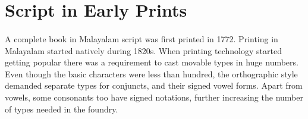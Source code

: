 \documentclass[10pt]{article}
\begin{document}
%
%
%
%
%




\section{Script in Early Prints }


\paragraph{}
A complete book in Malayalam script was first printed in 1772. Printing in Malayalam started natively during 1820s. When printing technology started getting popular there was a requirement to cast movable types in huge numbers. Even though the basic characters were less than hundred, the orthographic style demanded separate types for conjuncts, and their signed vowel forms. Apart from vowels, some consonants too have signed notations, further increasing the number of types needed in the foundry. 
\end{document}
